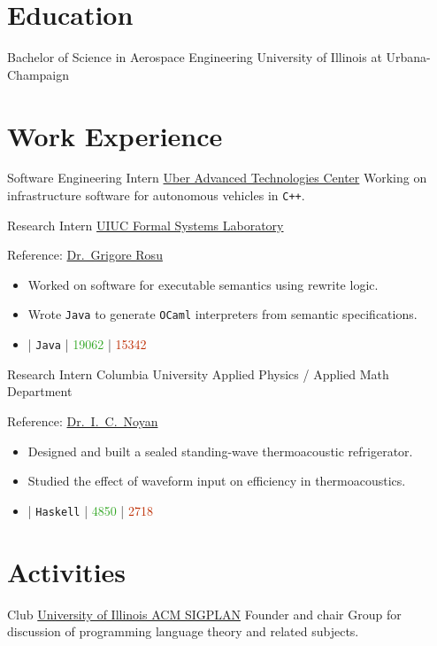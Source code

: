 \documentclass[10pt,letterpaper,sans]{moderncv}
\newcommand{\wlink}[2]{\textcolor[HTML]{0020B6}{\href{#1}{#2}}}
\newcommand{\ghlink}[2]{\wlink{https://github.com/#1}{#2}}
\newcommand{\ghrepo}[1]{\ghlink{#1}{\faGithub}}
\newcommand{\ghlang}[1]{\texttt{#1}}
\newcommand{\ghadd}[1]{\textcolor[HTML]{30A622}{{\faPlusCircle} #1}}
\newcommand{\ghrem}[1]{\textcolor[HTML]{BD2C00}{{\faMinusCircle} #1}}
\newcommand{\ghub}[4]{\ghrepo{#2} | \ghlang{#1} | \ghadd{#3} | \ghrem{#4}}
\begin{document}
\makecvtitle{}

\section{Education}
        {Bachelor of Science in Aerospace Engineering}
        {University of Illinois at Urbana-Champaign}
        {}{}
        {}
\section{Work Experience}
        {Software Engineering Intern}
        {\wlink{http://www.uberatc.com}{Uber Advanced Technologies Center}}
        {}{}
        {
Working on infrastructure software for autonomous vehicles in \texttt{C++}.
}

        {Research Intern}
        {\wlink{http://fsl.cs.illinois.edu}{UIUC Formal Systems Laboratory}}
        {}{}{
Reference: \wlink{http://tinyurl.com/grigore-rosu}{Dr.\ Grigore Rosu}
\begin{itemize}
\item Worked on software for executable semantics using rewrite logic.
\item Wrote \texttt{Java} to generate \texttt{OCaml} interpreters from
      semantic specifications.
\item \ghub{Java}{taktoa/k}{19062}{15342}
\end{itemize}
}

        {Research Intern}
        {Columbia University Applied Physics / Applied Math Department}
        {}{}{
Reference: \wlink{http://tinyurl.com/i-cevdet-noyan}{Dr.\ I.\ C.\ Noyan}
\begin{itemize}
\item Designed and built a sealed standing-wave thermoacoustic refrigerator.
\item Studied the effect of waveform input on efficiency in thermoacoustics.
\item \ghub{Haskell}{taktoa/ThermoCalc}{4850}{2718}
\end{itemize}
}

\section{Activities}
        {Club}
        {\wlink{http://category.engineering}{University of Illinois ACM SIGPLAN}}
        {Founder and chair}{}{
Group for discussion of programming language theory and related subjects.
}
\end{document}
